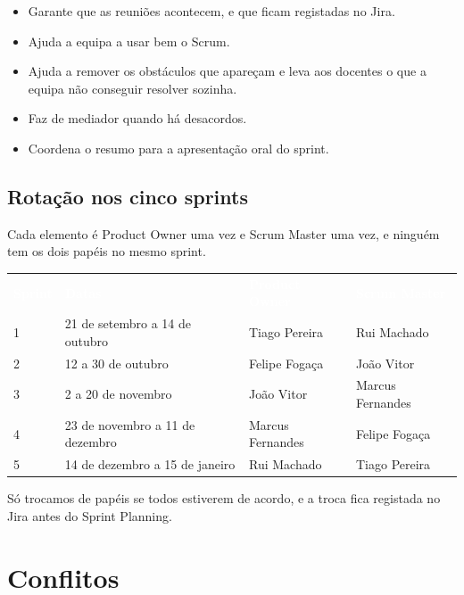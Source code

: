 \documentclass[11pt,a4paper]{article}
\newcommand{\th}[1]{\textcolor{white}{\sffamily\bfseries #1}}
\begin{document}
\begin{tcolorbox}[caixa, title={Scrum Master}]
  \begin{itemize}
    \item Garante que as reuniões acontecem, e que ficam registadas no Jira.
    \item Ajuda a equipa a usar bem o Scrum.
    \item Ajuda a remover os obstáculos que apareçam e leva aos docentes o que a equipa não conseguir resolver sozinha.
    \item Faz de mediador quando há desacordos.
    \item Coordena o resumo para a apresentação oral do sprint.
  \end{itemize}
\end{tcolorbox}

\subsection{Rotação nos cinco sprints}

Cada elemento é Product Owner uma vez e Scrum Master uma vez, e ninguém tem os dois papéis no mesmo sprint.

\renewcommand{\arraystretch}{1.5}
\begin{tabularx}{\textwidth}{N{1.6cm} L{5.2cm} Y Y}
   \th{Sprint} & \th{Datas} & \th{Product Owner} & \th{Scrum Master} \\
   1 & 21 de setembro a 14 de outubro & Tiago Pereira  & Rui Machado \\
          2 & 12 a 30 de outubro             & Felipe Fogaça   & João Vitor \\
   3 & 2 a 20 de novembro             & João Vitor      & Marcus Fernandes \\
          4 & 23 de novembro a 11 de dezembro & Marcus Fernandes & Felipe Fogaça \\
   5 & 14 de dezembro a 15 de janeiro & Rui Machado     & Tiago Pereira \\
  \bottomrule
\end{tabularx}
\renewcommand{\arraystretch}{1}

Só trocamos de papéis se todos estiverem de acordo, e a troca fica registada no Jira antes do Sprint Planning.

\section{Conflitos}
\end{document}
